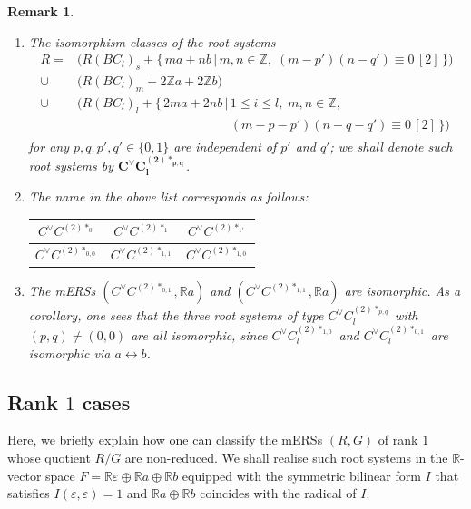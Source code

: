 \documentclass[11pt]{amsart}
\newcommand{\R}{\mathbb{R}}
\newcommand{\Z}{\mathbb{Z}}
\newtheorem{rem}[thm]{Remark}%
\newcommand{\vep}{\varepsilon}
\begin{document}
\begin{rem}\label{rem_CC2}
\begin{enumerate}
\item
The isomorphism classes of the root systems
\begin{align*}
R =
&\big( R(BC_l)_s+\{ \, ma+nb\, \vert\, m,n \in \Z, \; (m-p')(n-q')\equiv 0\, [2]\, \}\big) \\
\cup
&\big( R(BC_l)_m+2\Z a+2\Z b \big)  \\
\cup
&\big( R(BC_l)_l+ \{ \, 2ma+2nb\, \vert\, 1\leq i\leq l, \; m,n \in \Z, \\
& \phantom{\big( R(BC_l)_l+ \{ \, 2ma+2nb\, \vert\,}(m-p-p')(n-q-q')\equiv 0\, [2]\, \}\big)
\end{align*}
for any $p,q, p', q' \in \{0,1\}$
are independent of $p'$ and $q'$; we shall denote such root systems by $\mathbf{C^\vee C_l^{(2)\ast_{p,q}}}$. 
\item The name in the above list corresponds as follows:
\begin{center}
\begin{tabular}{|c|c|c|} \hline
$C^\vee C^{(2)\ast_0}$  & 
$C^\vee C^{(2)\ast_1}$  & 
$C^\vee C^{(2)\ast_{1'}}$ \\ \hline
$C^\vee C^{(2)\ast_{0,0}}$ & 
$C^\vee C^{(2)\ast_{1,1}}$ & 
$C^\vee C^{(2)\ast_{1,0}}$ \\ \hline
\end{tabular}
\end{center}
\item The mERSs $(C^\vee C^{(2)\ast_{0,1}}, \R a)$ and $(C^\vee C^{(2)\ast_{1,1}}, \R a)$ are isomorphic. As a corollary, one sees that the three root systems of type $C^\vee C_l^{(2)\ast_{p,q}}$ with $(p,q) \neq (0,0)$ are all isomorphic, since $C^\vee C_l^{(2)\ast_{1,0}}$ and $C^\vee C_l^{(2)\ast_{0,1}}$ are isomorphic via $a \leftrightarrow b$.
\end{enumerate}
\end{rem}



\subsection{Rank $1$ cases}\label{sect_rank-1} 
Here, we briefly explain how one can classify the mERSs $(R,G)$ of rank $1$ whose quotient $R/G$ are non-reduced. We shall realise such root systems in the $\R$-vector space $F=\R \vep \oplus \R a \oplus \R b$ equipped with the symmetric bilinear form $I$ that satisfies $I(\vep, \vep)=1$ and $\R a \oplus \R b$ coincides with the radical of $I$. 
\end{document}
